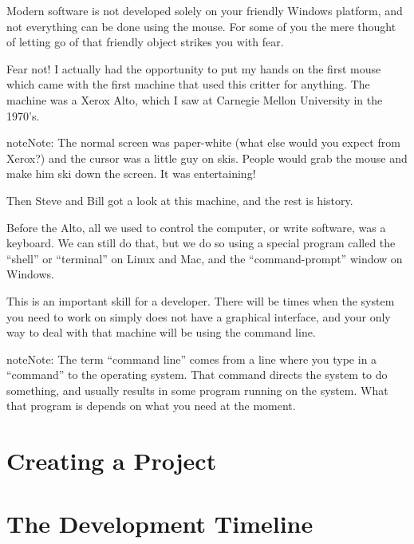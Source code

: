 \documentclass[letterpaper,11pt,english]{sphinxmanual}
\begin{document}
Modern software is not developed solely on your friendly Windows platform, and
not everything can be done using the mouse. For some of you the mere thought of
letting go of that friendly object strikes you with fear.

Fear not! I actually had the opportunity to put my hands on the first mouse
which came with the first machine that used this critter for anything. The
machine was a Xerox Alto, which I saw at Carnegie Mellon University in the
1970’s.


\begin{sphinxadmonition}{note}{Note:}
The normal screen was paper-white (what else would you expect from Xerox?)
and the cursor was a little guy on skis. People would grab the mouse and
make him ski down the screen. It was entertaining!
\end{sphinxadmonition}

Then Steve and Bill got a look at this machine, and the rest is history.

Before the Alto, all we used to control the computer, or write software, was a
keyboard. We can still do that, but we do so using a special program called the
“shell” or “terminal” on Linux and Mac, and the “command-prompt” window on
Windows.

This is an important skill for a developer. There will be times when the system
you need to work on simply does not have a graphical interface, and your only
way to deal with that machine will be using the command line.

\begin{sphinxadmonition}{note}{Note:}
The term “command line” comes from a line where you type in a “command” to
the operating system. That command directs the system to do something, and
usually results in some program running on the system. What that program is
depends on what you need at the moment.
\end{sphinxadmonition}


\chapter{Creating a Project}
\label{\detokenize{appendix/project-layout:creating-a-project}}\label{\detokenize{appendix/project-layout::doc}}

\chapter{The Development Timeline}
\label{\detokenize{appendix/development-timeline::doc}}\label{\detokenize{appendix/development-timeline:the-development-timeline}}
\end{document}
